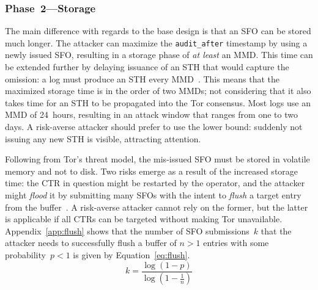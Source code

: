 %

\subsubsection{Phase~2---Storage} \label{sec:auditor:analysis:phase2}
The main difference with regards to the base design is that an SFO can be
stored much longer.  The attacker can maximize the \texttt{audit\_after}
timestamp by using a newly issued SFO, resulting in a storage phase of \emph{at
least} an MMD.  This time can be extended further by delaying issuance of an
STH that would capture the omission:
	a log must produce an STH every MMD~\cite{ct,ct/bis}.
This means that the maximized storage time is in the order of two MMDs; not
considering that it also takes time for an STH to be propagated into the Tor
consensus.  Most logs use an MMD of 24~hours, resulting in an attack window that
ranges from one to two days.  A risk-averse attacker should prefer to use the
lower bound:
	suddenly not issuing any new STH is visible, attracting attention.

Following from Tor's threat model, the mis-issued SFO must be stored in
volatile memory and not to disk.  Two risks emerge as a result of the increased
storage time:
	the CTR in question might be restarted by the operator,
	and the attacker might \emph{flood} it by submitting many SFOs with the
		intent to \emph{flush} a target entry from the buffer~\cite{nordberg}.
A risk-averse attacker cannot rely on the former, but the latter is applicable
if all CTRs can be targeted without making Tor unavailable.
Appendix~\ref{app:flush} shows that the number of SFO submissions~$k$
that the attacker needs to successfully flush a buffer of $n>1$ entries with
some probability~$p<1$ is given by Equation~\ref{eq:flush}.
\begin{equation} \label{eq:flush}
	k = \frac{\log(1-p)}{\log(1 - \frac{1}{n})}
\end{equation}

